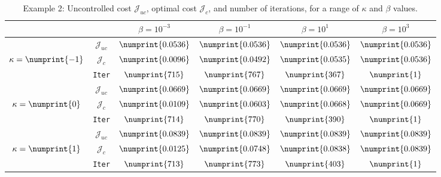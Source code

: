 \begin{table}
\begin{tabular}{ | c | c || c | c | c | c ||}
\hline
\multicolumn{2}{|c||}{}& $\beta = 10^{-3}$ & $\beta = 10^{-1}$ & $\beta = 10^{1}$ & $\beta = 10^{3}$  \\
\hline
\hline
 & $\mathcal{J}_{uc}$ & $\numprint{0.0536}$ & $\numprint{0.0536}$ & $\numprint{0.0536}$ & $\numprint{0.0536}$ \\
$\kappa= \numprint{-1}$  & $\mathcal{J}_c$ & $\numprint{0.0096}$ & $\numprint{0.0492}$ & $\numprint{0.0535}$ & $\numprint{0.0536}$ \\
& \texttt{Iter} & $\numprint{715}$ & $\numprint{767}$ & $\numprint{367}$ & $\numprint{1}$ \\
\hline
 & $\mathcal{J}_{uc}$ & $\numprint{0.0669}$ & $\numprint{0.0669}$ & $\numprint{0.0669}$ & $\numprint{0.0669}$ \\
$\kappa= \numprint{0}$  & $\mathcal{J}_c$ & $\numprint{0.0109}$ & $\numprint{0.0603}$ & $\numprint{0.0668}$ & $\numprint{0.0669}$ \\
& \texttt{Iter} & $\numprint{714}$ & $\numprint{770}$ & $\numprint{390}$ & $\numprint{1}$ \\
\hline
 & $\mathcal{J}_{uc}$ & $\numprint{0.0839}$ & $\numprint{0.0839}$ & $\numprint{0.0839}$ & $\numprint{0.0839}$ \\
$\kappa= \numprint{1}$  & $\mathcal{J}_c$ & $\numprint{0.0125}$ & $\numprint{0.0748}$ & $\numprint{0.0838}$ & $\numprint{0.0839}$ \\
& \texttt{Iter} & $\numprint{713}$ & $\numprint{773}$ & $\numprint{403}$ & $\numprint{1}$ \\
\hline
\end{tabular}
\caption{Example 2: Uncontrolled cost $\mathcal{J}_{uc}$, optimal cost $\mathcal{J}_{c}$, and number of iterations, for a range of $\kappa$ and $\beta$ values.}
\label{TabS5:Prob2}
\end{table}